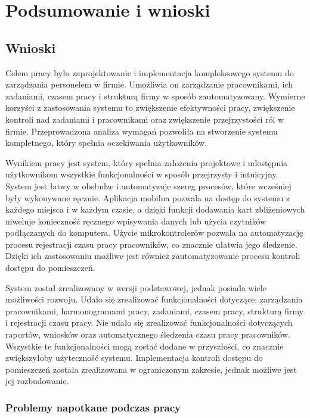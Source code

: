 \chapter{Podsumowanie i wnioski}

\section{Wnioski}

Celem pracy było zaprojektowanie i implementacja kompleksowego systemu do zarządzania personelem w firmie. Umożliwia on zarządzanie pracownikami, ich zadaniami, czasem pracy i strukturą firmy w sposób zautomatyzowany. Wymierne korzyści z zastosowania systemu to zwiększenie efektywności pracy, zwiększenie kontroli nad zadaniami i pracownikami oraz zwiększenie przejrzystości ról w firmie. Przeprowadzona analiza wymagań pozwoliła na stworzenie systemu kompletnego, który spełnia oczekiwania użytkowników.

Wynikiem pracy jest system, który spełnia założenia projektowe i udostępnia użytkownikom wszystkie funkcjonalności w sposób przejrzysty i intuicyjny. System jest łatwy w obsłudze i automatyzuje szereg procesów, które wcześniej były wykonywane ręcznie. Aplikacja mobilna pozwala na dostęp do systemu z każdego miejsca i w każdym czasie, a dzięki funkcji dodawania kart zbliżeniowych niweluje konieczność ręcznego wpisywania danych lub użycia czytników podłączanych do komputera. Użycie mikrokontrolerów pozwala na automatyzację procesu rejestracji czasu pracy pracowników, co znacznie ułatwia jego śledzenie. Dzięki ich zastosowaniu możliwe jest również zautomatyzowanie procesu kontroli dostępu do pomieszczeń.

System został zrealizowany w wersji podstawowej, jednak posiada wiele możliwości rozwoju. Udało się zrealizować funkcjonalności dotyczące: zarządzania pracownikami, harmonogramami pracy, zadaniami, czasem pracy, strukturą firmy i rejestracji czasu pracy. Nie udało się zrealizować funkcjonalności dotyczących raportów, wniosków oraz automatycznego śledzenia czasu pracy pracowników. Wszystkie te funkcjonalności mogą zostać dodane w przyszłości, co znacznie zwiększyłoby użyteczność systemu. Implementacja kontroli dostępu do pomieszczeń została zrealizowana w ograniczonym zakresie, jednak możliwe jest jej rozbudowanie.

\subsection{Problemy napotkane podczas pracy}

